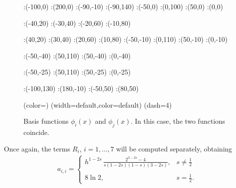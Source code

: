 \begin{figure}[h]
\figinit{0.7pt}
:(-100,0) :(200,0)
:(-90,-10) :(-90,140)
:(-50,0) :(0,100) 
:(50,0) :(0,0)

:(-40,20) :(-30,40) 
:(-20,60) :(-10,80)

:(40,20) :(30,40) 
:(20,60) :(10,80)
%
:(-50,-10) :(0,110) 
:(50,-10) :(0,-10)

:(-50,-40) :(50,110) 
:(50,-40) :(0,-40)

:(-50,-25) :(50,110) 
:(50,-25) :(0,-25)

:(-100,130) :(180,-10)
:(-50,50) :(80,50)

\figdrawbegin{}
\figdrawarrow[1,2]
\figset (color=\Redrgb)
\figdrawline[3,4]
\figdrawline[4,5]
\figset (width=default,color=default)
\figset(dash=4)
\figdrawline[4,6]
\figdrawline[41,61]
\figdrawarrow[11,12]

\figdrawend

\centerline{\box\figBoxA}
\caption{Basis functions $\phi_i(x)$ and $\phi_j(x)$. In this case, the two functions coincide.}\label{basis_dia}
\end{figure}

Once again, the terms $R_i$, $i=1,\ldots,7$ will be computed separately, obtaining
\begin{align*}
	a_{i,i} = \begin{cases}
			\displaystyle h^{1-2s}\,\frac{2^{3-2s}-4}{s(1-2s)(1-s)(3-2s)}, & \displaystyle s\neq\frac{1}{2}
			\\
			\\
			8\ln 2, & \displaystyle s=\frac{1}{2}.			
			\end{cases}	
\end{align*}

